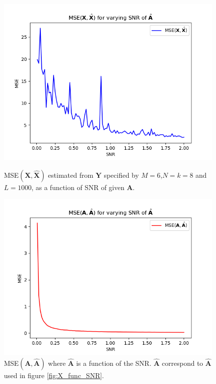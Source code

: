 \begin{figure}[H]
    \begin{minipage}[t]{.45\textwidth}
    	\centering
		\includegraphics[scale=0.5]{figures/ch_6/X_func_SNR.png}
		\caption{MSE$(\mathbf{X},\hat{\mathbf{X}})$ estimated from $\mathbf{Y}$ specified by $M = 6$,$N = k = 8$ and $L = 1000$, as a function of SNR of given $\mathbf{A}$.}
		\label{fig:X_func_SNR}
    \end{minipage} 
    \hfill
    \begin{minipage}[t]{.45\textwidth}
        \centering
		\includegraphics[scale=0.5]{figures/ch_6/A_func_SNR.png}
		\caption{MSE$(\mathbf{A},\hat{\mathbf{A}})$ where $\hat{\mathbf{A}}$ is a function of the SNR. $\hat{\mathbf{A}}$ correspond to $\hat{\mathbf{A}}$ used in figure \ref{fig:X_func_SNR}.}
		\label{fig:A_func_SNR}
    \end{minipage}
\end{figure}
\noindent